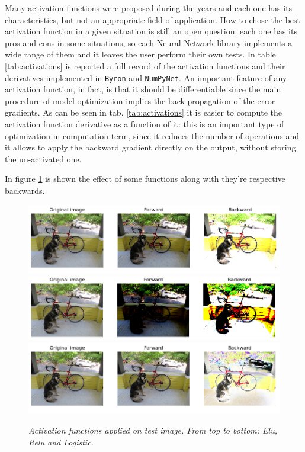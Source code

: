 \documentclass[12pt,a4paper]{report}
\begin{document}
Many activation functions were proposed during the years and each one has its characteristics, but not an appropriate field of application. 
How to chose the best activation function in a given situation is still an open question: each one has its pros and cons in some situations, so each Neural Network library implements a wide range of them and it leaves the user perform their own tests.
In table \ref{tab:activations} is reported a full record of the activation functions and their derivatives implemented in {\tt Byron} and {\tt NumPyNet}.
An important feature of any activation function, in fact, is that it should be differentiable since the main procedure of model optimization implies the back-propagation of the error gradients.
As can be seen in tab. \ref{tab:activations} it is easier to compute the activation function derivative as a function of it: this is an important type of optimization in computation term, since it reduces the number of operations and it allows to apply the backward gradient directly on the output, without storing the un-activated one.

In figure \ref{fig:activations} is shown the effect of some functions along with they're respective backwards.

\begin{figure}[H]
 \includegraphics[scale=0.5]{./images/activation_elu}
 \includegraphics[scale=0.5]{./images/activation_relu.png}
 \includegraphics[scale=0.5]{./images/activation_logistic.png}
 \caption{\it Activation functions applied on test image. From top to bottom: Elu, Relu and Logistic.}
 \label{fig:activations}
\end{figure}
\end{document}
